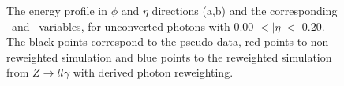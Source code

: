 \begin{figure}[htbp]
	\begin{tcolorbox}[colback=black!5!white,colframe=white!75!black]
    \caption{The energy profile in $\phi$ and $\eta$ directions (a,b) and the corresponding \Rphi \ and \Reta \ variables, for unconverted photons with 0.00 $ < |\eta| < $ 0.20. The black points correspond to the pseudo data, red points to non-reweighted simulation and blue points to the reweighted simulation from $Z\rightarrow ll\gamma$ with derived photon reweighting.}
    \label{Photon:1}
    \end{tcolorbox}
    
\end{figure}
\begin{figure}[htbp]
    \centering
	 \\

\end{figure}
